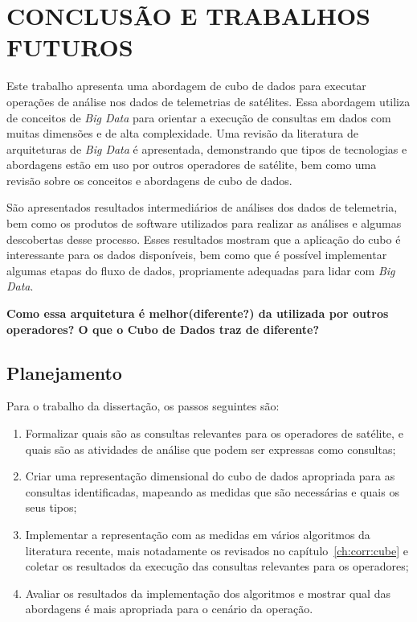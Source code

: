 
\chapter{CONCLUSÃO E TRABALHOS FUTUROS}
\label{ch:concl}

Este trabalho apresenta uma abordagem de cubo de dados para executar operações de análise nos dados de telemetrias de satélites.
Essa abordagem utiliza de conceitos de \textit{Big Data} para orientar a execução de consultas em dados com muitas dimensões e de alta complexidade.
Uma revisão da literatura de arquiteturas de \textit{Big Data} é apresentada, demonstrando que tipos de tecnologias e abordagens estão em uso por outros operadores de satélite, bem como uma revisão sobre os conceitos e abordagens de cubo de dados.

São apresentados resultados intermediários de análises dos dados de telemetria, bem como os produtos de software utilizados para realizar as análises e algumas descobertas desse processo.
Esses resultados mostram que a aplicação do cubo é interessante para os dados disponíveis, bem como que é possível implementar algumas etapas do fluxo de dados, propriamente adequadas para lidar com \textit{Big Data}.

{\color{red}
\bfseries Como essa arquitetura é melhor(diferente?) da utilizada por outros operadores? O que o Cubo de Dados traz de diferente?
}

\section{Planejamento}
\label{ch:concl:planning}

Para o trabalho da dissertação, os passos seguintes são:

\begin{enumerate}
\item Formalizar quais são as consultas relevantes para os operadores de satélite, e quais são as atividades de análise que podem ser expressas como consultas;
\item Criar uma representação dimensional do cubo de dados apropriada para as consultas identificadas, mapeando as medidas que são necessárias e quais os seus tipos;
\item Implementar a representação com as medidas em vários algoritmos da literatura recente, mais notadamente os revisados no capítulo~\ref{ch:corr:cube} e coletar os resultados da execução das consultas relevantes para os operadores;
\item Avaliar os resultados da implementação dos algoritmos e mostrar qual das abordagens é mais apropriada para o cenário da operação.
\end{enumerate}

